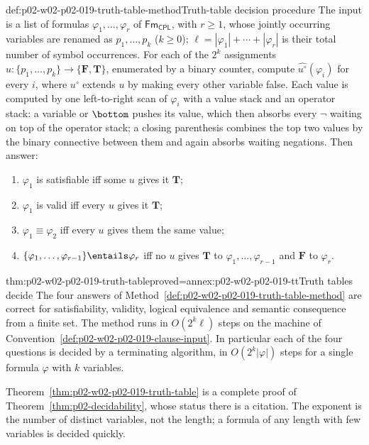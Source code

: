 \begin{hbmethod}{def:p02-w02-p02-019-truth-table-method}{Truth-table decision procedure}
The input is a list of formulas \(\varphi_1,\ldots,\varphi_r\) of
\(\mathsf{Fm}_{\mathsf{CPL}}\), with \(r\geq 1\), whose jointly occurring variables are renamed as
\(p_1,\ldots,p_k\) (\(k\geq 0\)); \(\ell=|\varphi_1|+\cdots+|\varphi_r|\) is
their total number of symbol occurrences.  For each of the \(2^k\)
assignments \(u:\{p_1,\ldots,p_k\}\to\{\mathbf{F},\mathbf{T}\}\), enumerated by a
binary counter, compute \(\widehat{u^{\circ}}(\varphi_i)\) for every \(i\),
where \(u^{\circ}\) extends \(u\) by making every other variable false.  Each
value is computed by one left-to-right scan of \(\varphi_i\) with a value
stack and an operator stack: a variable or \(\bottom\) pushes its value, which
then absorbs every \(\neg\) waiting on top of the operator stack; a closing
parenthesis combines the top two values by the binary connective between them
and again absorbs waiting negations.  Then answer:
\begin{enumerate}
  \item \(\varphi_1\) is satisfiable iff some \(u\) gives it \(\mathbf{T}\);
  \item \(\varphi_1\) is valid iff every \(u\) gives it \(\mathbf{T}\);
  \item \(\varphi_1\equiv\varphi_2\) iff every \(u\) gives them the same value;
  \item \(\{\varphi_1,\ldots,\varphi_{r-1}\}\entails\varphi_r\) iff no \(u\)
        gives \(\mathbf{T}\) to \(\varphi_1,\ldots,\varphi_{r-1}\) and \(\mathbf{F}\)
        to \(\varphi_r\).
\end{enumerate}
\end{hbmethod}

\begin{hbtheorem}{thm:p02-w02-p02-019-truth-table}{proved=annex:p02-w02-p02-019-tt}{Truth tables decide}
The four answers of Method~\ref{def:p02-w02-p02-019-truth-table-method} are
correct for satisfiability, validity, logical equivalence and semantic
consequence from a finite set.  The method runs in \(O(2^k\ell)\) steps on the
machine of Convention~\ref{def:p02-w02-p02-019-clause-input}.  In particular
each of the four questions is decided by a terminating algorithm, in
\(O(2^k|\varphi|)\) steps for a single formula \(\varphi\) with \(k\)
variables.
\end{hbtheorem}

Theorem~\ref{thm:p02-w02-p02-019-truth-table} is a complete proof of
Theorem~\ref{thm:p02-decidability}, whose status there is a citation.  The
exponent is the number of distinct variables, not the length; a formula of any
length with few variables is decided quickly.

